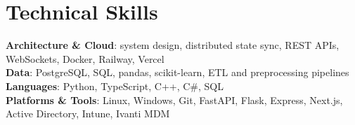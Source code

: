 \documentclass[letterpaper,11pt]{article}
\begin{document}
\section{Technical Skills}
 \begin{itemize}[leftmargin=0.15in, label={}]
    \small{\item{
     \textbf{Architecture \& Cloud}{: system design, distributed state sync, REST APIs, WebSockets, Docker, Railway, Vercel} \\
     \textbf{Data}{: PostgreSQL, SQL, pandas, scikit-learn, ETL and preprocessing pipelines} \\
     \textbf{Languages}{: Python, TypeScript, C++, C\#, SQL} \\
     \textbf{Platforms \& Tools}{: Linux, Windows, Git, FastAPI, Flask, Express, Next.js, Active Directory, Intune, Ivanti MDM}
    }}
 \end{itemize}
\end{document}
